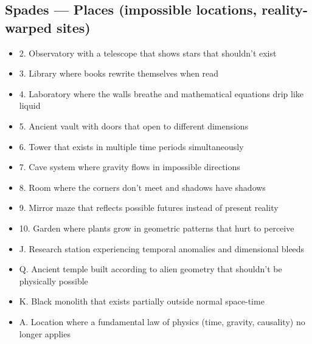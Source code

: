 \documentclass[11pt]{article}
\begin{document}
\subsection*{Spades — Places (impossible locations, reality-warped sites)}
\begin{itemize}[leftmargin=*]
\item 2. Observatory with a telescope that shows stars that shouldn't exist
\item 3. Library where books rewrite themselves when read
\item 4. Laboratory where the walls breathe and mathematical equations drip like liquid
\item 5. Ancient vault with doors that open to different dimensions
\item 6. Tower that exists in multiple time periods simultaneously
\item 7. Cave system where gravity flows in impossible directions
\item 8. Room where the corners don't meet and shadows have shadows
\item 9. Mirror maze that reflects possible futures instead of present reality
\item 10. Garden where plants grow in geometric patterns that hurt to perceive
\item J. Research station experiencing temporal anomalies and dimensional bleeds
\item Q. Ancient temple built according to alien geometry that shouldn't be physically possible
\item K. Black monolith that exists partially outside normal space-time
\item A. Location where a fundamental law of physics (time, gravity, causality) no longer applies
\end{itemize}
\end{document}
